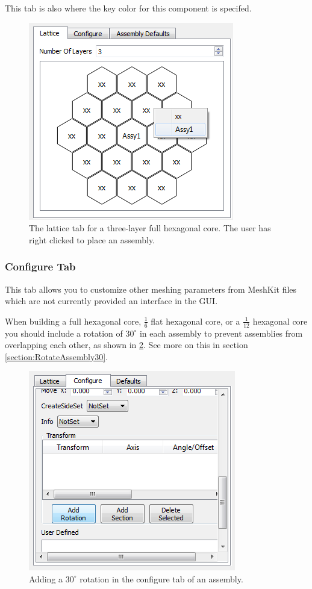 This tab is also where the key color for this component is specifed.

\begin{figure}[h]
	\begin{center}
		\includegraphics[width=0.3\linewidth]{Images/hex-19.png}
		\caption{The lattice tab for a three-layer full hexagonal core.  The user has right clicked to place an assembly.}
		\label{fig:latticetab}
	\end{center}
\end{figure}

\subsubsection{Configure Tab}
This tab allows you to customize other meshing parameters from MeshKit files which are not currently provided an interface in the GUI. 

When building a full hexagonal core, $\frac{1}{6}$ flat hexagonal core, or a $\frac{1}{12}$ hexagonal core you should include a rotation of $30^\circ$ in each assembly to prevent assemblies from overlapping each other, as shown in \ref{fig:configuretab}.  See more on this in section \ref{section:RotateAssembly30}.

\begin{figure}[h]
	\begin{center}
		\includegraphics[width=0.4\linewidth]{Images/hex-16.png}
		\caption{Adding a $30^\circ$ rotation in the configure tab of an assembly.}
		\label{fig:configuretab}
	\end{center}
\end{figure}

